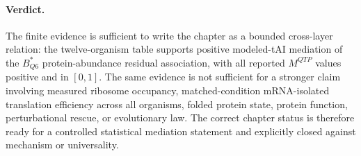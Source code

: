\paragraph{Verdict.}
The finite evidence is sufficient to write the chapter as a bounded cross-layer relation: the twelve-organism table supports positive modeled-tAI mediation of the $B^*_{Q6}$ protein-abundance residual association, with all reported $M^{QTP}$ values positive and in $[0,1]$.  The same evidence is not sufficient for a stronger claim involving measured ribosome occupancy, matched-condition mRNA-isolated translation efficiency across all organisms, folded protein state, protein function, perturbational rescue, or evolutionary law.  The correct chapter status is therefore ready for a controlled statistical mediation statement and explicitly closed against mechanism or universality.

